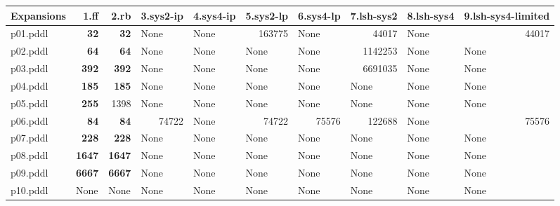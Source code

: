 \documentclass{article}
\begin{document}
\begin{tabular}{@{}lrrrrrrrrr@{}}
Expansions & 1.ff & 2.rb & 3.sys2-ip & 4.sys4-ip & 5.sys2-lp & 6.sys4-lp & 7.lsh-sys2 & 8.lsh-sys4 & 9.lsh-sys4-limited \\
\midrule
p01.pddl & \textbf{32} & \textbf{32} & \multicolumn{1}{|l|}{None} & \multicolumn{1}{|l|}{None} & 163775 & \multicolumn{1}{|l|}{None} & 44017 & \multicolumn{1}{|l|}{None} & 44017 \\
p02.pddl & \textbf{64} & \textbf{64} & \multicolumn{1}{|l|}{None} & \multicolumn{1}{|l|}{None} & \multicolumn{1}{|l|}{None} & \multicolumn{1}{|l|}{None} & 1142253 & \multicolumn{1}{|l|}{None} & \multicolumn{1}{|l|}{None} \\
p03.pddl & \textbf{392} & \textbf{392} & \multicolumn{1}{|l|}{None} & \multicolumn{1}{|l|}{None} & \multicolumn{1}{|l|}{None} & \multicolumn{1}{|l|}{None} & 6691035 & \multicolumn{1}{|l|}{None} & \multicolumn{1}{|l|}{None} \\
p04.pddl & \textbf{185} & \textbf{185} & \multicolumn{1}{|l|}{None} & \multicolumn{1}{|l|}{None} & \multicolumn{1}{|l|}{None} & \multicolumn{1}{|l|}{None} & \multicolumn{1}{|l|}{None} & \multicolumn{1}{|l|}{None} & \multicolumn{1}{|l|}{None} \\
p05.pddl & \textbf{255} & 1398 & \multicolumn{1}{|l|}{None} & \multicolumn{1}{|l|}{None} & \multicolumn{1}{|l|}{None} & \multicolumn{1}{|l|}{None} & \multicolumn{1}{|l|}{None} & \multicolumn{1}{|l|}{None} & \multicolumn{1}{|l|}{None} \\
p06.pddl & \textbf{84} & \textbf{84} & 74722 & \multicolumn{1}{|l|}{None} & 74722 & 75576 & 122688 & \multicolumn{1}{|l|}{None} & 75576 \\
p07.pddl & \textbf{228} & \textbf{228} & \multicolumn{1}{|l|}{None} & \multicolumn{1}{|l|}{None} & \multicolumn{1}{|l|}{None} & \multicolumn{1}{|l|}{None} & \multicolumn{1}{|l|}{None} & \multicolumn{1}{|l|}{None} & \multicolumn{1}{|l|}{None} \\
p08.pddl & \textbf{1647} & \textbf{1647} & \multicolumn{1}{|l|}{None} & \multicolumn{1}{|l|}{None} & \multicolumn{1}{|l|}{None} & \multicolumn{1}{|l|}{None} & \multicolumn{1}{|l|}{None} & \multicolumn{1}{|l|}{None} & \multicolumn{1}{|l|}{None} \\
p09.pddl & \textbf{6667} & \textbf{6667} & \multicolumn{1}{|l|}{None} & \multicolumn{1}{|l|}{None} & \multicolumn{1}{|l|}{None} & \multicolumn{1}{|l|}{None} & \multicolumn{1}{|l|}{None} & \multicolumn{1}{|l|}{None} & \multicolumn{1}{|l|}{None} \\
p10.pddl & \multicolumn{1}{|l|}{None} & \multicolumn{1}{|l|}{None} & \multicolumn{1}{|l|}{None} & \multicolumn{1}{|l|}{None} & \multicolumn{1}{|l|}{None} & \multicolumn{1}{|l|}{None} & \multicolumn{1}{|l|}{None} & \multicolumn{1}{|l|}{None} & \multicolumn{1}{|l|}{None} \\

\end{tabular}
\end{document}

